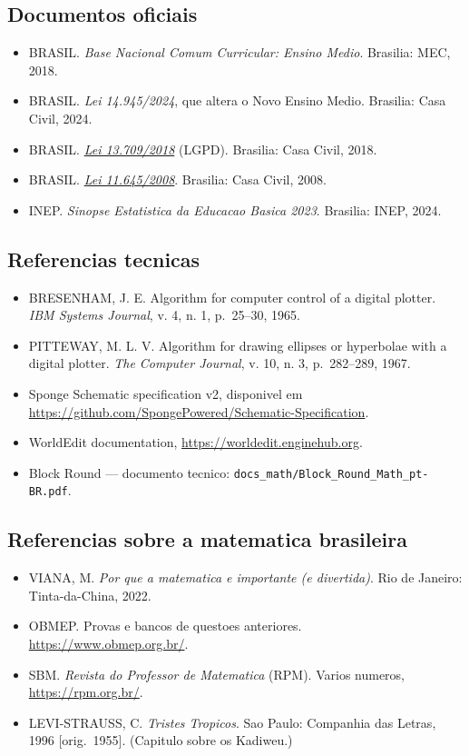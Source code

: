 \documentclass[12pt,a4paper]{scrartcl}
\begin{document}
\subsection{Documentos oficiais}
\begin{itemize}[leftmargin=1.3em,itemsep=0.15em,topsep=0.3em]
  \item BRASIL. \emph{Base Nacional Comum Curricular: Ensino Medio}. Brasilia: MEC, 2018.
  \item BRASIL. \emph{Lei 14.945/2024}, que altera o Novo Ensino Medio. Brasilia: Casa Civil, 2024.
  \item BRASIL. \href{https://www.planalto.gov.br/ccivil_03/_ato2015-2018/2018/lei/l13709.htm}{\emph{Lei 13.709/2018}} (LGPD). Brasilia: Casa Civil, 2018.
  \item BRASIL. \href{https://www.planalto.gov.br/ccivil_03/_ato2007-2010/2008/lei/l11645.htm}{\emph{Lei 11.645/2008}}. Brasilia: Casa Civil, 2008.
  \item INEP. \emph{Sinopse Estatistica da Educacao Basica 2023}. Brasilia: INEP, 2024.
\end{itemize}

\subsection{Referencias tecnicas}
\begin{itemize}[leftmargin=1.3em,itemsep=0.15em,topsep=0.3em]
  \item BRESENHAM, J. E. Algorithm for computer control of a digital plotter. \emph{IBM Systems Journal}, v. 4, n. 1, p.~25--30, 1965.
  \item PITTEWAY, M. L. V. Algorithm for drawing ellipses or hyperbolae with a digital plotter. \emph{The Computer Journal}, v. 10, n. 3, p.~282--289, 1967.
  \item Sponge Schematic specification v2, disponivel em \url{https://github.com/SpongePowered/Schematic-Specification}.
  \item WorldEdit documentation, \url{https://worldedit.enginehub.org}.
  \item Block Round --- documento tecnico: \texttt{docs\_math/Block\_Round\_Math\_pt-BR.pdf}.
\end{itemize}

\subsection{Referencias sobre a matematica brasileira}
\begin{itemize}[leftmargin=1.3em,itemsep=0.15em,topsep=0.3em]
  \item VIANA, M. \emph{Por que a matematica e importante (e divertida)}. Rio de Janeiro: Tinta-da-China, 2022.
  \item OBMEP. Provas e bancos de questoes anteriores. \url{https://www.obmep.org.br/}.
  \item SBM. \emph{Revista do Professor de Matematica} (RPM). Varios numeros, \url{https://rpm.org.br/}.
  \item LEVI-STRAUSS, C. \emph{Tristes Tropicos}. Sao Paulo: Companhia das Letras, 1996 [orig.~1955]. (Capitulo sobre os Kadiweu.)
\end{itemize}
\end{document}
